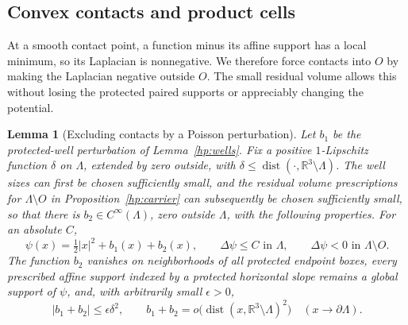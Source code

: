 \documentclass[11pt]{article}
\numberwithin{equation}{section}
\newtheorem{lemma}[theorem]{Lemma}
\theoremstyle{definition}
\theoremstyle{remark}
\begin{document}
\subsection{Convex contacts and product cells}

At a smooth contact point, a function minus its affine support has a
local minimum, so its Laplacian is nonnegative.  We therefore force
contacts into $O$ by making the Laplacian negative outside $O$.  The
small residual volume allows this without losing the protected paired
supports or appreciably changing the potential.

\begin{lemma}[Excluding contacts by a Poisson perturbation]\label{qt:poisson}
Let $b_1$ be the protected-well perturbation of Lemma~\ref{hp:wells}.
Fix a positive $1$-Lipschitz function $\delta$ on $\Lambda$, extended by
zero outside, with $\delta\leq\operatorname{dist}(\cdot,\mathbb R^3\setminus\Lambda)$.
The well sizes can first be chosen sufficiently small, and the residual
volume prescriptions for $\Lambda\setminus O$ in
Proposition~\ref{hp:carrier} can subsequently be chosen sufficiently small,
so that there is $b_2\in C^\infty(\Lambda)$, zero outside $\Lambda$,
with the following properties.  For an absolute $C$,
\begin{equation}\label{qt:laplacian}
 \psi(x)=\tfrac12|x|^2+b_1(x)+b_2(x),\qquad
 \Delta\psi\leq C\text{ in }\Lambda,\qquad
 \Delta\psi<0\text{ in }\Lambda\setminus O.
\end{equation}
The function $b_2$ vanishes on neighborhoods of all protected endpoint
boxes, every prescribed affine support indexed by a protected
horizontal slope remains a global support of $\psi$, and, with
arbitrarily small $\epsilon>0$,
\begin{equation}\label{qt:potential-smallness}
 |b_1+b_2|\leq\epsilon\delta^2,\qquad
 b_1+b_2=o\bigl(\operatorname{dist}(x,\mathbb R^3\setminus\Lambda)^2\bigr)
 \quad(x\to\partial\Lambda).
\end{equation}
\end{lemma}
\end{document}
